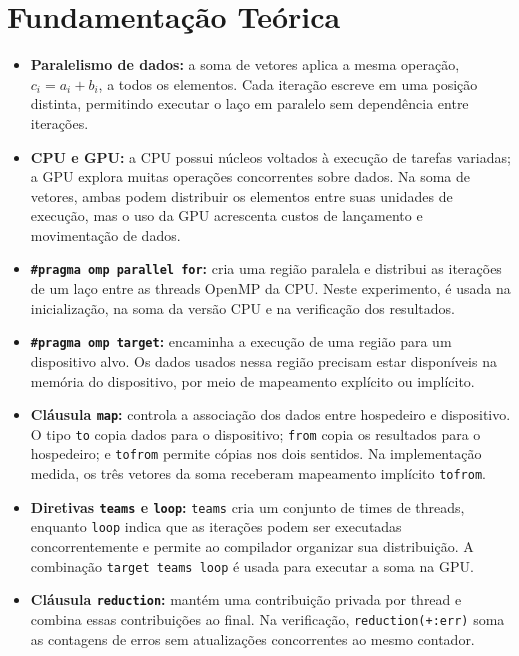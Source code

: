\documentclass[11pt,letterpaper]{article}
\begin{document}
\section{Fundamentação Teórica}
\begin{itemize}
\item \textbf{Paralelismo de dados:} a soma de vetores aplica a mesma operação, $c_i=a_i+b_i$, a todos os elementos. Cada iteração escreve em uma posição distinta, permitindo executar o laço em paralelo sem dependência entre iterações.

\item \textbf{CPU e GPU:} a CPU possui núcleos voltados à execução de tarefas variadas; a GPU explora muitas operações concorrentes sobre dados. Na soma de vetores, ambas podem distribuir os elementos entre suas unidades de execução, mas o uso da GPU acrescenta custos de lançamento e movimentação de dados.

\item \textbf{\texttt{\#pragma omp parallel for}:} cria uma região paralela e distribui as iterações de um laço entre as threads OpenMP da CPU. Neste experimento, é usada na inicialização, na soma da versão CPU e na verificação dos resultados.

\item \textbf{\texttt{\#pragma omp target}:} encaminha a execução de uma região para um dispositivo alvo. Os dados usados nessa região precisam estar disponíveis na memória do dispositivo, por meio de mapeamento explícito ou implícito.

\item \textbf{Cláusula \texttt{map}:} controla a associação dos dados entre hospedeiro e dispositivo. O tipo \texttt{to} copia dados para o dispositivo; \texttt{from} copia os resultados para o hospedeiro; e \texttt{tofrom} permite cópias nos dois sentidos. Na implementação medida, os três vetores da soma receberam mapeamento implícito \texttt{tofrom}.

\item \textbf{Diretivas \texttt{teams} e \texttt{loop}:} \texttt{teams} cria um conjunto de times de threads, enquanto \texttt{loop} indica que as iterações podem ser executadas concorrentemente e permite ao compilador organizar sua distribuição. A combinação \texttt{target teams loop} é usada para executar a soma na GPU.

\item \textbf{Cláusula \texttt{reduction}:} mantém uma contribuição privada por thread e combina essas contribuições ao final. Na verificação, \texttt{reduction(+:err)} soma as contagens de erros sem atualizações concorrentes ao mesmo contador.


\end{itemize}
\end{document}
